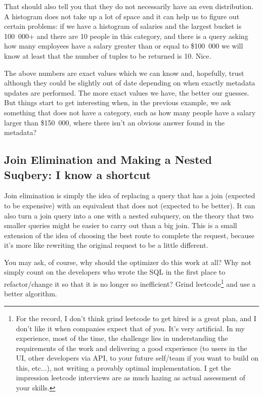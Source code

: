 That should also tell you that they do not necessarily have an even distribution. A histogram does not take up a lot of space and it can help us to figure out certain problems: if we have a histogram of salaries and the largest bucket is 100~000+ and there are 10 people in this category, and there is a query asking how many employees have a salary greater than or equal to \$100~000 we will know at least that the number of tuples to be returned is 10. Nice.

The above numbers are exact values which we can know and, hopefully, trust although they could be slightly out of date depending on when exactly metadata updates are performed. The more exact values we have, the better our guesses. But things start to get interesting when, in the previous example, we ask something that does not have a category, such as how many people have a salary larger than \$150~000, where there isn't an obvious answer found in the metadata?

\subsection*{Join Elimination and Making a Nested Suqbery: I know a shortcut}
Join elimination is simply the idea of replacing a query that has a join (expected to be expensive) with an equivalent that does not (expected to be better). It can also turn a join query into a one with a nested subquery, on the theory that two smaller queries might be easier to carry out than a big join. This is a small extension of the idea of choosing the best route to complete the request, because it's more like rewriting the original request to be a little different.

You may ask, of course, why should the optimizer do this work at all? Why not simply count on the developers who wrote the SQL in the first place to refactor/change it so that it is no longer so inefficient? Grind leetcode\footnote{For the record, I don't think grind leetcode to get hired is a great plan, and I don't like it when companies expect that of you. It's very artificial. In my experience, most of the time, the challenge lies in understanding the requirements of the work and delivering a good experience (to users in the UI, other developers via API, to your future self/team if you want to build on this, etc...), not writing a provably optimal implementation. I get the impression leetcode interviews are as much hazing as actual assessment of your skills.} and use a better algorithm.

